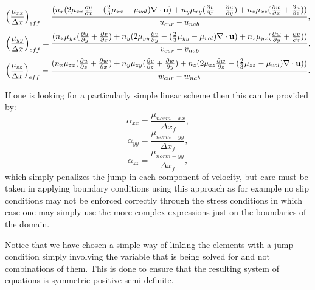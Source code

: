 \begin{equation}
\left( \frac{\mu_{xx}}{\Delta x} \right)_{eff}=
\frac{
({n_x} (2\mu_{xx}
\frac{\partial u}{\partial x}
-(\frac{2}{3}\mu_{xx}-\mu_{vol})\nabla\cdot{\bf u} 
)
+
 {n_y} \mu_{xy}
(
\frac{\partial v}{\partial x}+\frac{\partial u}{\partial y})
+
{n_z} \mu_{xz}
(
\frac{\partial w}{\partial x}+\frac{\partial u}{\partial z})
 )
}
{ u_{cur}-u_{nab}}, 
\end{equation}
\begin{equation}
\left( \frac{\mu_{yy}}{\Delta x} \right)_{eff}=
\frac{({n_x} \mu_{yx}
(
\frac{\partial u}{\partial y}+\frac{\partial v}{\partial x}
)
+
{n_y}(2\mu_{yy}
\frac{\partial v}{\partial y}
-(\frac{2}{3}\mu_{yy}-\mu_{vol})\nabla\cdot{\bf u} 
)
+
{n_z} \mu_{yz}
(
\frac{\partial w}{\partial y}+\frac{\partial v}{\partial z})
 )
}
{ v_{cur}-v_{nab}}, 
\end{equation}
\begin{equation}
\left( \frac{\mu_{zz}}{\Delta x} \right)_{eff}=
\frac{({n_x} \mu_{zx}
(
\frac{\partial u}{\partial z}+\frac{\partial w}{\partial x})
+
{n_y} \mu_{zy}
(
\frac{\partial v}{\partial z}+\frac{\partial w}{\partial y})
+
{n_z} (2 \mu_{zz}
\frac{\partial w}{\partial z}
-(\frac{2}{3}\mu_{zz}-\mu_{vol})\nabla\cdot{\bf u} 
) )
}
{ w_{cur}-w_{nab}}. 
\end{equation}

If one is looking for a particularly simple linear scheme then this can 
be provided by:
\begin{equation}
\alpha_{xx}=\frac{\mu_{norm-xx}}{\Delta x_f},
\end{equation} 
\begin{equation}
\alpha_{yy}=\frac{\mu_{norm-yy}}{\Delta x_f},
\end{equation} 
\begin{equation}
\alpha_{zz}=\frac{\mu_{norm-yy}}{\Delta x_f},
\end{equation} 
which simply penalizes the jump in each component of velocity, but care 
must be taken in applying boundary conditions using this approach as 
for example no slip conditions may not be enforced correctly through the 
stress conditions in which case one may simply use the more complex expressions 
just on the boundaries of the domain. 

Notice that we have chosen a simple way of linking the 
elements with a jump condition simply involving the 
variable that is being solved for and not combinations 
of them. This is done to ensure that the 
resulting system of equations is symmetric positive semi-definite. 




